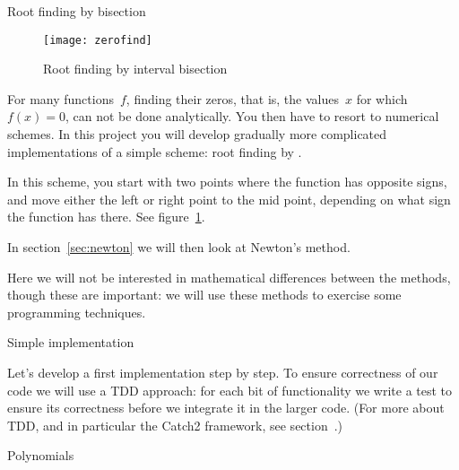 
 {Root finding by bisection}
\label{sec:root-bisection}

\begin{figure}[ht]
  \texttt{[image: zerofind]}
  \caption{Root finding by interval bisection}
  \label{fig:zerofind}
\end{figure}

For many functions~$f$, finding their zeros, that is, the values~$x$
for which~$f(x)=0$, can not be done analytically. You then have to
resort to numerical  schemes.
In this project you will develop gradually more complicated
implementations of a simple scheme:
root finding by .

In this scheme, you start with two points where the function has opposite signs,
and move either the left or right point to the mid point,
depending on what sign the function has there.
See figure~\ref{fig:zerofind}.

In section~\ref{sec:newton} we will then look at Newton's method.

Here we will not be interested in mathematical differences between the methods,
though these are important:
we will use these methods to exercise some programming techniques.

 {Simple implementation}
\label{sec:rootfindarray}


Let's develop a first implementation step by step.
To ensure correctness of our code we will use a \acf{TDD} approach:
for each bit of functionality we write a test
to ensure its correctness before we integrate it in the larger code.
(For more about \ac{TDD}, and in particular the Catch2 framework,
see section~.)

 {Polynomials}

